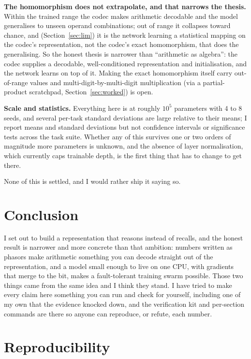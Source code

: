 \documentclass[11pt]{article}
\begin{document}
\textbf{The homomorphism does not extrapolate, and that narrows the thesis.} Within the trained range
the codec makes arithmetic decodable and the model generalises to unseen operand combinations; out of
range it collapses toward chance, and (Section~\ref{sec:lim}) it is the network learning a statistical
mapping on the codec's representation, not the codec's exact homomorphism, that does the generalising.
So the honest thesis is narrower than ``arithmetic as algebra'': the codec supplies a decodable,
well-conditioned representation and initialisation, and the network learns on top of it. Making the
exact homomorphism itself carry out-of-range values and multi-digit-by-multi-digit multiplication (via a
partial-product scratchpad, Section~\ref{sec:worked}) is open.

\textbf{Scale and statistics.} Everything here is at roughly $10^5$ parameters with 4 to 8 seeds, and
several per-task standard deviations are large relative to their means; I report means and standard
deviations but not confidence intervals or significance tests across the task suite. Whether any of this
survives one or two orders of magnitude more parameters is unknown, and the absence of layer
normalisation, which currently caps trainable depth, is the first thing that has to change to get there.

None of this is settled, and I would rather ship it saying so.

\section{Conclusion}

I set out to build a representation that reasons instead of recalls, and the honest result is narrower
and more concrete than that ambition: numbers written as phasors make arithmetic something you can
decode straight out of the representation, and a model small enough to live on one CPU, with gradients
that merge to the bit, makes a fault-tolerant training swarm possible. Those two things came from the
same idea and I think they stand. I have tried to make every claim here something you can run and check
for yourself, including one of my own that the evidence knocked down, and the verification kit and
per-section commands are there so anyone can reproduce, or refute, each number.

\section*{Reproducibility}
\end{document}
